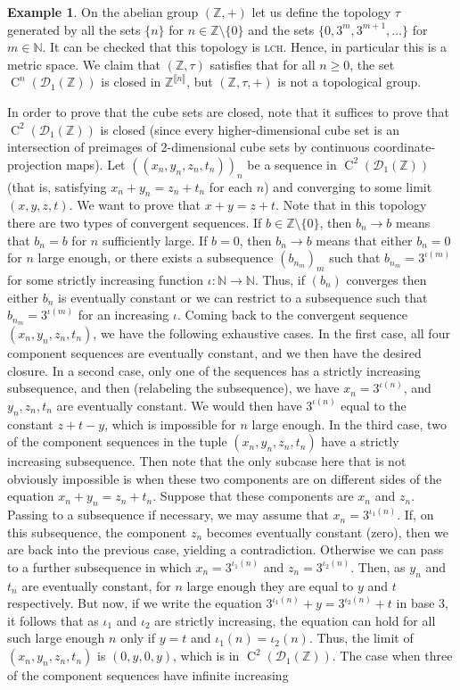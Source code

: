 \documentclass[a4paper,12pt,reqno]{amsart}
\theoremstyle{definition}
\newtheorem{example}[theorem]{Example}
\def\to{\rightarrow}
\newcommand*{\db}[1]{\llbracket #1\rrbracket}
\newcommand{\mc}{\mathcal}
\newcommand{\mb}{\mathbb}
\DeclareMathOperator{\cu}{C}
\begin{document}
\begin{example}
On the abelian group $(\mb{Z},+)$ let us define the topology $\tau$ generated by all the sets $\{n\}$ for $n\in \mb{Z}\setminus\{0\}$ and the sets $\{0,3^m,3^{m+1},\ldots\}$ for $m\in \mb{N}$. It can be checked that this topology is \textsc{lch}. Hence, in particular this is a metric space. We claim that $(\mb{Z},\tau)$ satisfies that for all $n\ge 0$, the set $\cu^n(\mc{D}_1(\mb{Z}))$ is closed in $\mb{Z}^{\db{n}}$, but $(\mb{Z},\tau,+)$ is not a topological group. 

In order to prove that the cube sets are closed, note that it suffices to prove that $\cu^2(\mc{D}_1(\mb{Z}))$ is closed (since every higher-dimensional cube set is an intersection of preimages of 2-dimensional cube sets by continuous coordinate-projection maps). Let $((x_n,y_n,z_n,t_n))_n$ be a sequence in $\cu^2(\mc{D}_1(\mb{Z}))$ (that is, satisfying $x_n+y_n=z_n+t_n$ for each $n$) and converging to some limit $(x,y,z,t)$. We want to prove that $x+y=z+t$. Note that in this topology there are two types of convergent sequences. If $b\in \mb{Z}\setminus\{0\}$, then $b_n\to  b$ means that $b_n=b$ for $n$ sufficiently large. If $b=0$, then $b_n\to b$ means that either $b_n=0$ for $n$ large enough, or there exists a subsequence $(b_{n_m})_m$ such that $b_{n_m}=3^{\iota(m)}$ for some strictly increasing function $\iota:\mb{N}\to \mb{N}$. Thus, if $(b_n)$ converges then either $b_n$ is eventually constant or we can restrict to a subsequence such that $b_{n_m}=3^{\iota(m)}$ for an increasing $\iota$. Coming back to the convergent sequence $(x_n,y_n,z_n,t_n)$, we have the following exhaustive cases. In the first case,  all four component sequences are eventually constant, and we then have the desired closure. In a second case, only one of the sequences has a strictly increasing subsequence, and then (relabeling the subsequence), we have $x_n=3^{\iota(n)}$, and $y_n,z_n,t_n$ are eventually constant. We would then have $3^{\iota(n)}$ equal to the constant $z+t-y$, which is impossible for $n$ large enough. In the third case, two of the component sequences in the tuple $(x_n,y_n,z_n,t_n)$ have a strictly increasing subsequence. Then note that the only subcase here that is not obviously impossible is when these two components are on different sides of the equation $x_n+y_n = z_n+t_n$. Suppose that these components are $x_n$ and $z_n$. Passing to a subsequence if necessary, we may assume that $x_n=3^{\iota_1(n)}$. If, on this subsequence, the component $z_n$ becomes eventually constant (zero), then we are back into the previous case, yielding a contradiction. Otherwise we can pass to a further subsequence in which $x_n=3^{\iota_1(n)}$ and $z_n=3^{\iota_2(n)}$. Then, as $y_n$ and $t_n$ are eventually constant, for $n$ large enough they are equal to $y$ and $t$ respectively. But now, if we write the equation $3^{\iota_1(n)}+y=3^{\iota_2(n)}+t$ in base 3, it follows that as $\iota_1$ and $\iota_2$ are strictly increasing, the equation can hold for all such large enough $n$ only if $y=t$ and $\iota_1(n)=\iota_2(n)$. Thus, the limit of $(x_n,y_n,z_n,t_n)$ is $(0,y,0,y)$,  which is in $\cu^2(\mc{D}_1(\mb{Z}))$. The case when three of the component sequences have infinite increasing 
\end{example}
\end{document}
